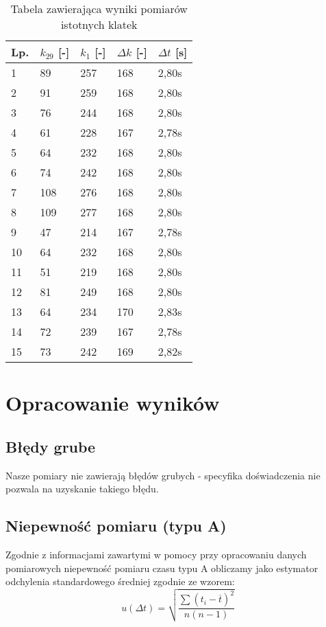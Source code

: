 \documentclass[a4paper,12pt]{article}
\begin{document}
\begin{justify}
\begin{table}[h!]
\begin{center}
\begin{scriptsize}
\begin{tabular}{|l|l|l|l|l|}
\hline
Lp. & $k_{29}$ [-] & $k_{1}$ [-] & $\Delta k$ [-] & $\Delta t$ [s] \\
\hline
1 & 89 & 257 & 168 & 2,80s \\
2 & 91 & 259 & 168 & 2,80s \\
3 & 76 & 244 & 168 & 2,80s  \\
4 & 61 & 228 & 167 & 2,78s \\
5 & 64 & 232 & 168 & 2,80s \\
6 & 74 & 242 & 168 & 2,80s \\
7 & 108 & 276 & 168 & 2,80s \\
8 & 109 & 277 & 168 & 2,80s \\
9 & 47 & 214 & 167 & 2,78s \\
10 & 64 & 232 & 168 & 2,80s \\
11 & 51 & 219 & 168 & 2,80s  \\
12 & 81 & 249 & 168 & 2,80s \\
13 & 64 & 234 & 170 & 2,83s \\
14 & 72 & 239 & 167 & 2,78s \\
15 & 73 & 242 & 169 & 2,82s \\
\hline
\end{tabular}
\caption{Tabela zawierająca wyniki pomiarów istotnych klatek}
\label{table:1}
\end{scriptsize}
\end{center}
\end{table}

\section{Opracowanie wyników}

\subsection{Błędy grube}
Nasze pomiary nie zawierają błędów grubych - specyfika doświadczenia nie pozwala na uzyskanie takiego błędu.

\subsection{Niepewność pomiaru (typu A)}
Zgodnie z informacjami zawartymi w pomocy przy opracowaniu danych pomiarowych \cite{urlniepewnosci} niepewność pomiaru czasu typu A obliczamy jako estymator odchylenia standardowego średniej zgodnie ze wzorem: \\
\begin{equation}
u(\Delta t) = \sqrt{\frac{\sum(t_{i} - \overline{t})^2}{n (n-1)}}
\end{equation}


\end{justify}
\end{document}
